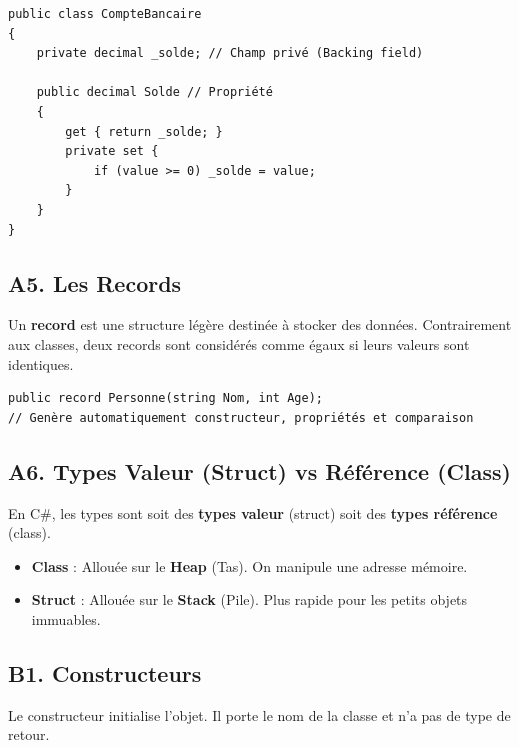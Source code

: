     
\vspace{0.5cm}

\begin{verbatim}
public class CompteBancaire
{
    private decimal _solde; // Champ privé (Backing field)

    public decimal Solde // Propriété
    {
        get { return _solde; }
        private set { 
            if (value >= 0) _solde = value; 
        }
    }
}
\end{verbatim}

\subsection*{A5. Les Records}
{}
\noindent Un \textbf{record} est une structure légère destinée à stocker des données. Contrairement aux classes, deux records sont considérés comme égaux si leurs valeurs sont identiques.

\begin{verbatim}
public record Personne(string Nom, int Age); 
// Genère automatiquement constructeur, propriétés et comparaison
\end{verbatim}

\subsection*{A6. Types Valeur (Struct) vs Référence (Class)}
{}
\noindent En C\#, les types sont soit des \textbf{types valeur} (struct) soit des \textbf{types référence} (class).
\begin{itemize}
    \item \textbf{Class} : Allouée sur le \textbf{Heap} (Tas). On manipule une adresse mémoire.
    \item \textbf{Struct} : Allouée sur le \textbf{Stack} (Pile). Plus rapide pour les petits objets immuables.
\end{itemize}

\subsection*{B1. Constructeurs}
{}
\noindent Le constructeur initialise l'objet. Il porte le nom de la classe et n'a pas de type de retour.

\vspace{0.5cm}


